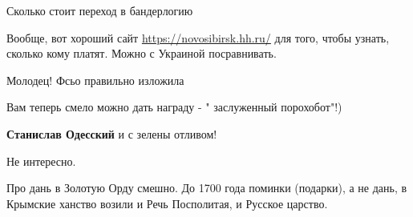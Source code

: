 \begin{itemize}
Сколько стоит переход в бандерлогию

 
Вообще, вот хороший сайт \url{https://novosibirsk.hh.ru/} для того, чтобы
узнать, сколько кому платят. Можно с Украиной посравнивать.

 
Молодец! Фсьо правильно изложила

 
Вам теперь смело можно дать награду - " заслуженный порохобот"!)

\begin{itemize}
 
\textbf{Станислав Одесский} и с зелены отливом!
\end{itemize}

 
Не интересно.

 

Про дань в Золотую Орду смешно. До 1700 года поминки (подарки), а не дань, в
Крымские ханство возили и Речь Посполитая, и Русское царство. 


\end{itemize}
